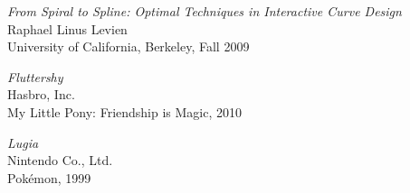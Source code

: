 \documentclass[a4paper]{article}
\begin{document}
	\begin{thebibliography}{}

			\emph{From Spiral to Spline: Optimal Techniques in Interactive Curve Design}\\
			Raphael Linus Levien\\
			University of California, Berkeley, Fall 2009

			\emph{Fluttershy}\\
			Hasbro, Inc.\\
			My Little Pony: Friendship is Magic, 2010

			\emph{Lugia}\\
			Nintendo Co., Ltd.\\
			Pokémon, 1999

	\end{thebibliography}
\end{document}
